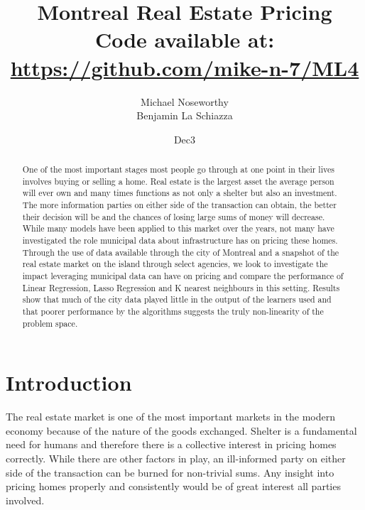 \documentclass{acm_proc_article-sp}
\begin{document}
\title{Montreal Real Estate Pricing \\
{\normalsize Code available at: \url{https://github.com/mike-n-7/ML4}}} 
\subtitle{}

\author{
\alignauthor 
Michael Noseworthy \\
	\affaddr{}
\alignauthor Benjamin La Schiazza\\
}

\date{Dec3}

\maketitle
\begin{abstract}
	One of the most important stages most people go through at one point in their lives involves buying or selling a home.  Real estate is the largest asset the average person will ever own and many times functions as not only a shelter but also an investment. The more information parties on either side of the transaction can obtain, the better their decision will be and the chances of losing large sums of money will decrease. While many models have been applied to this market over the years, not many have investigated the role municipal data about infrastructure has on pricing these homes. Through the use of data available through the city of Montreal and a snapshot of the real estate market on the island through select agencies, we look to investigate the impact leveraging municipal data can have on pricing and compare the performance of Linear Regression, Lasso Regression and K nearest neighbours in this setting. Results show that much of the city data played little in the output of the learners used and that poorer performance by the algorithms suggests the truly non-linearity of the problem space.

\end{abstract}

\section{Introduction}

	The real estate market is one of the most important markets in the modern economy because of the nature of the goods exchanged. Shelter is a fundamental need for humans and therefore there is a collective interest in pricing homes correctly. While there are other factors in play, an ill-informed party on either side of the transaction can be burned for non-trivial sums. Any insight into pricing homes properly and consistently would be of great interest all parties involved. 
	
\end{document}
